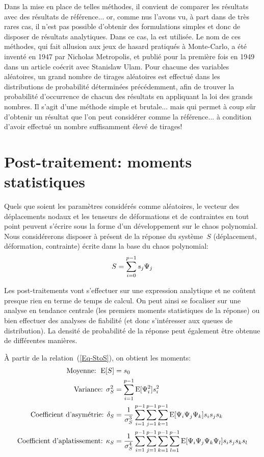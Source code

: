 \medskip
Dans la mise en place de telles méthodes, il convient de comparer les résultats avec des résultats de référence... or, comme nus l'avons vu, à part dans de très rares cas, il n'est pas possible d'obtenir des formulations simples et donc de disposer de résultats analytiques.
Dans ce cas, la  est utilisée. Le nom de ces méthodes, qui fait allusion aux jeux de hasard pratiqués à Monte-Carlo, a été inventé en 1947 par Nicholas Metropolis, et publié pour la première fois en 1949 dans un article coécrit avec Stanislaw Ulam. Pour chacune des variables aléatoires, un grand nombre de tirages aléatoires est effectué dans les distributions de probabilité déterminées précédemment, afin de trouver la probabilité d'occurrence de chacun des résultats en appliquant la loi des grands nombres. Il s'agit d'une méthode simple et brutale... mais qui permet à coup sûr d'obtenir un résultat que l'on peut considérer comme la référence... à condition d'avoir effectué un nombre suffisamment élevé de tirages!


\medskip
\section{Post-traitement: moments statistiques}

Quels que soient les paramètres considérés comme aléatoires, le vecteur des déplacements nodaux et les tenseurs de déformations et de contraintes en tout point peuvent s'écrire sous la forme d'un développement sur le chaos polynomial.
Nous considérerons disposer à présent de la réponse du système~$S$ (déplacement, déformation, contrainte) écrite dans la base du chaos polynomial:
\begin{equation}\label{Eq-StoS}
S=\displaystyle\sum_{i=0}^{p-1}s_j\Psi_j
\end{equation}

Les post-traitements vont s'effectuer sur une expression analytique et ne coûtent presque rien en terme de temps de calcul. On peut ainsi se focaliser sur une analyse en tendance centrale (les premiers moments statistiques de la réponse) ou bien effectuer des analyses de fiabilité (et donc s'intéresser aux queues de distribution). La densité de probabilité de la réponse peut également être obtenue de différentes manières.

\medskip
À partir de la relation~(\ref{Eq-StoS}), on obtient les moments:
\begin{align}
\text{Moyenne: } \operatorname{E}[S] &=s_0\\
\text{Variance: } \sigma^2_S &=\displaystyle\sum_{i=1}^{p-1}\operatorname{E}[\Psi_i^2]s_i^2\\
\text{Coefficient d'asymétrie: } \delta_S &=\dfrac1{\sigma^3_S}\displaystyle\sum_{i=1}^{p-1}\displaystyle\sum_{j=1}^{p-1}\displaystyle\sum_{k=1}^{p-1}\operatorname{E}[\Psi_i\Psi_j\Psi_k]s_is_js_k\\
\text{Coefficient d'aplatissement: } \kappa_S &=\dfrac1{\sigma^4_S}\displaystyle\sum_{i=1}^{p-1}\displaystyle\sum_{j=1}^{p-1}\displaystyle\sum_{k=1}^{p-1}\displaystyle\sum_{l=1}^{p-1}\operatorname{E}[\Psi_i\Psi_j\Psi_k\Psi_l]s_is_js_ks_l
\end{align}

